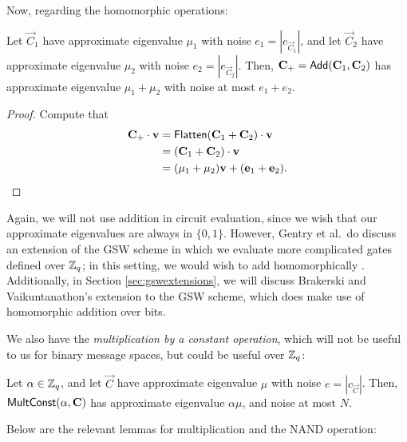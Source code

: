     Now, regarding the homomorphic operations:

    \begin{lemma}
        Let $\vec{C}_1$ have approximate eigenvalue $\mu_1$ with noise $e_1 = |e_{\vec{C}_1}|$, and let $\vec{C}_2$ have approximate eigenvalue $\mu_2$ with noise $e_2 = |e_{\vec{C}_2}|$. Then, $\vec{C}_+ = {\sf Add}(\vec{C}_1, \vec{C}_2)$ has approximate eigenvalue $\mu_1 + \mu_2$ with noise at most $e_1 + e_2$.
    \end{lemma}
    \begin{proof}
        Compute that
        \begin{align*}
            \vec{C}_+ \cdot \vec{v} &= {\sf Flatten}(\vec{C}_1 + \vec{C}_2) \cdot \vec{v} \\
            &= (\vec{C}_1 + \vec{C}_2) \cdot \vec{v} \\
            &= (\mu_1 + \mu_2) \vec{v} + (\vec{e}_1 + \vec{e}_2).
        \end{align*}
    \end{proof}

    Again, we will not use addition in circuit evaluation, since we wish that our approximate eigenvalues are always in $\{0,1\}$. However, Gentry et al.~do discuss an extension of the GSW scheme in which we evaluate more complicated gates defined over $\Z_q$; in this setting, we would wish to add homomorphically \cite{gsw}. Additionally, in Section \ref{sec:gswextensions}, we will discuss Brakerski and Vaikuntanathon's extension to the GSW scheme, which does make use of homomorphic addition over bits.

    We also have the \emph{multiplication by a constant operation}, which will not be useful to us for binary message spaces, but could be useful over $\Z_q$:
    \begin{lemma}
        Let $\alpha \in \Z_q$, and let $\vec{C}$ have approximate eigenvalue $\mu$ with noise $e = |c_{\vec{C}}|$. Then, ${\sf MultConst}(\alpha, \vec{C})$ has approximate eigenvalue $\alpha \mu$, and noise at most $N$.
    \end{lemma}


    Below are the relevant lemmas for multiplication and the NAND operation:

